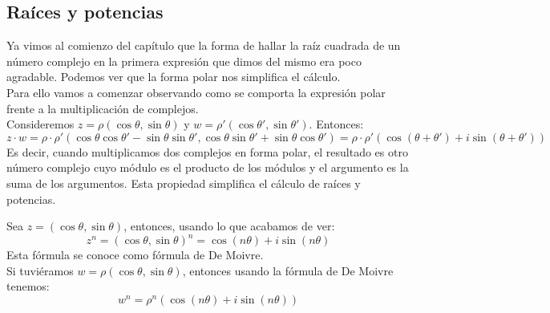 \subsection{Ra\'ices y potencias}

    Ya vimos al comienzo del capítulo que la forma de hallar la raíz cuadrada de un número complejo en la primera expresión que dimos del mismo era poco agradable. Podemos ver que la forma polar nos simplifica el cálculo.\\
    Para ello vamos a comenzar observando como se comporta la expresión polar frente a la multiplicación de complejos.\\

    Consideremos $z = \rho(\cos \theta, \sin \theta)$ y $w = \rho'(\cos \theta', \sin \theta')$. Entonces:
    $$
        z \cdot w = \rho \cdot \rho' (\cos \theta \cos \theta' - \sin \theta \sin \theta', \cos\theta \sin \theta' + \sin \theta \cos \theta') = \rho \cdot \rho' (\cos (\theta + \theta') + i\sin(\theta+\theta'))
    $$
    Es decir, cuando multiplicamos dos complejos en forma polar, el resultado es otro número complejo cuyo módulo es el producto de los módulos y el argumento es la suma de los argumentos. Esta propiedad simplifica el cálculo de raíces y potencias.

    \begin{eg}\label{eg:DeMoivre}
        Sea $z = (\cos \theta, \sin \theta)$, entonces, usando lo que acabamos de ver:
        $$
            z^n = (\cos \theta, \sin \theta)^n = \cos(n\theta) + i \sin(n\theta)
        $$
        Esta fórmula se conoce como fórmula de De Moivre.\\
        Si tuviéramos $w = \rho(\cos \theta, \sin \theta)$, entonces usando la fórmula de De Moivre tenemos:
        $$
            w^n = \rho^n (\cos(n\theta) + i\sin(n\theta))
        $$
    \end{eg}


